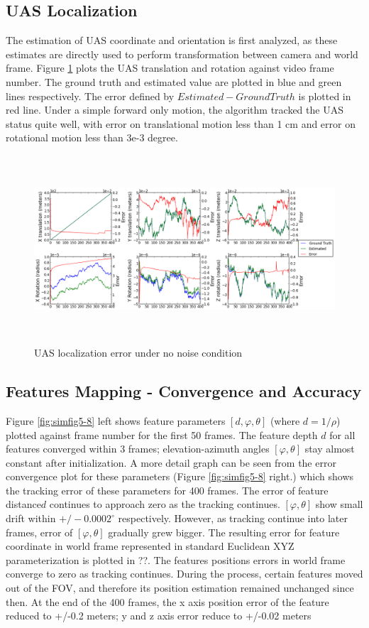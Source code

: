 \subsection{UAS Localization}
The estimation of UAS coordinate and orientation is first analyzed, as 
these estimates are directly used to perform transformation between 
camera and world frame. Figure \ref{fig:simfig1} plots the UAS 
translation and rotation against video frame number. The ground truth 
and estimated value are plotted in blue and green lines respectively. 
The error defined by $Estimated-Ground Truth$ is plotted in red line. 
Under a simple forward only motion, the algorithm tracked the UAS status 
quite well, with error on translational motion less than 1 cm and error 
on rotational motion less than 3e-3 degree. 

\begin{figure}[h]
\centering
\includegraphics[width=15cm, height=7cm]{./Figures/SimulationFigures/Figure1.png}
\caption{UAS localization error under no noise condition}
\label{fig:simfig1}
\end{figure}


\subsection{Features Mapping - Convergence and Accuracy}

Figure \ref{fig:simfig5-8} left shows feature parameters $[d, \varphi
,\theta]$ (where $d=1/\rho $) plotted against frame number for the
first 50 frames. The feature depth $d$ for all features converged
within 3 frames; elevation-azimuth angles $[\varphi ,\theta]$ stay
almost constant after initialization. A more detail graph can be seen
from the error convergence plot for these parameters (Figure
\ref{fig:simfig5-8} right.) which shows the tracking error of these
parameters for 400 frames. The error of feature distance$ d$ continues
to approach zero as the tracking continues. $[\varphi ,\theta]$ show
small drift within $+/-0.0002^{\circ}$ respectively. However, as
tracking continue into later frames, error of $[\varphi ,\theta]$
gradually grew bigger. The resulting error for feature coordinate in
world frame represented in standard Euclidean XYZ parameterization is
plotted in ??. The features positions errors in world frame converge
to zero as tracking continues. During the process, certain features
moved out of the FOV, and therefore its position estimation remained
unchanged since then. At the end of the 400 frames, the x axis
position error of the feature reduced to +/-0.2 meters; y and z axis
error reduce to +/-0.02 meters

